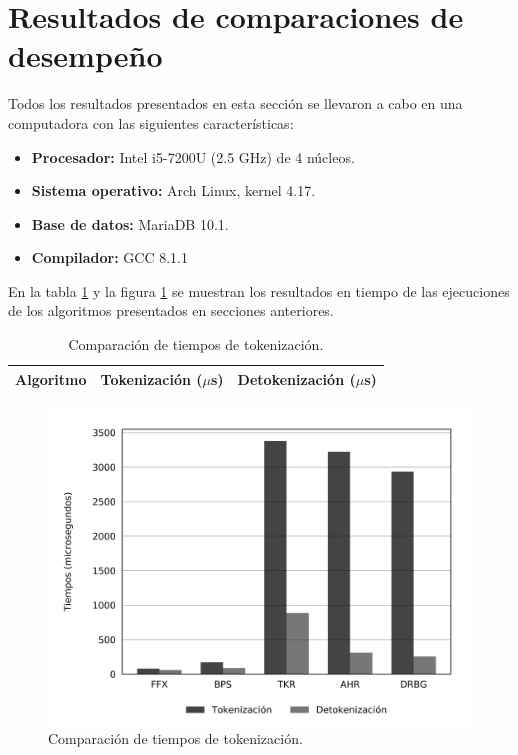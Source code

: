 %
%
%

\section{Resultados de comparaciones de desempeño}

Todos los resultados presentados en esta sección se llevaron a cabo en una
computadora con las siguientes características:

\begin{itemize}
    \item \textbf{Procesador:} Intel i5-7200U (2.5 GHz) de 4 núcleos.
    \item \textbf{Sistema operativo:} Arch Linux, kernel 4.17.
    \item \textbf{Base de datos:} MariaDB 10.1.
    \item \textbf{Compilador:} GCC 8.1.1
\end{itemize}

En la tabla \ref{tabla:tiempos_tokenizacion} y la figura
\ref{figura:tiempos_tokenizacion} se muestran los resultados en tiempo de
las ejecuciones de los algoritmos presentados en secciones anteriores.

\begin{table}
  \begin{center}
    \caption{Comparación de tiempos de tokenización.}
    \label{tabla:tiempos_tokenizacion}
    \begin{tabular}{|c|c|c|}
      \hline
      Algoritmo & Tokenización ($\mu$s) & Detokenización ($\mu$s) \\
      \hline
      
    \end{tabular}
  \end{center}
\end{table}

\begin{figure}
  \begin{center}
    \includegraphics[width=1.0\linewidth]
      {../implementaciones/reportes/tiempos_unitarios.png}
    \caption{Comparación de tiempos de tokenización.}
    \label{figura:tiempos_tokenizacion}
  \end{center}
\end{figure}
